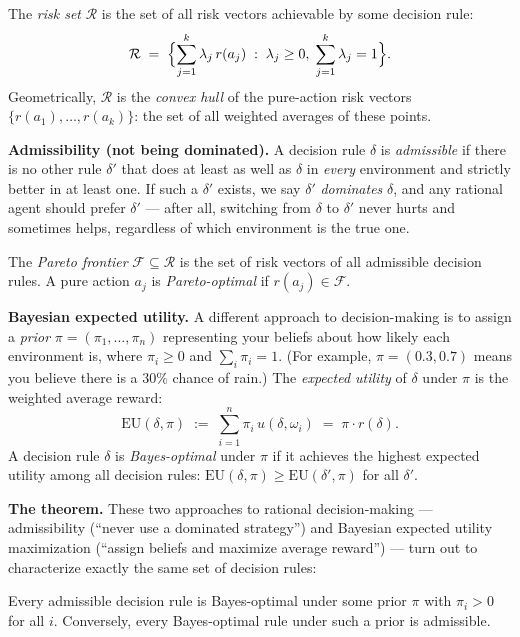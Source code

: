 \documentclass[11pt]{article}
\begin{document}
\begin{exercise}
\medskip
\noindent
The \emph{risk set} $\mathcal{R}$ is the set of all risk vectors achievable by some
decision rule:
\[
  \mathcal{R} \;=\; \Bigl\{\sum_{j=1}^k \lambda_j\, r(a_j) \;:\;
  \lambda_j \geq 0,\; \sum_{j=1}^k \lambda_j = 1\Bigr\}.
\]
Geometrically, $\mathcal{R}$ is the \emph{convex hull} of the pure-action risk
vectors $\{r(a_1), \ldots, r(a_k)\}$: the set of all weighted averages of these
points.

\medskip
\noindent
\textbf{Admissibility (not being dominated).} A decision rule $\delta$ is
\emph{admissible} if there is no other rule $\delta'$ that does at least as well as
$\delta$ in \emph{every} environment and strictly better in at least one. If such a
$\delta'$ exists, we say $\delta'$ \emph{dominates} $\delta$, and any rational agent
should prefer $\delta'$ --- after all, switching from $\delta$ to $\delta'$ never
hurts and sometimes helps, regardless of which environment is the true one.

\medskip
\noindent
The \emph{Pareto frontier} $\mathcal{F} \subseteq \mathcal{R}$ is the set of risk
vectors of all admissible decision rules. A pure action $a_j$ is
\emph{Pareto-optimal} if $r(a_j) \in \mathcal{F}$.

\medskip
\noindent
\textbf{Bayesian expected utility.} A different approach to decision-making is to
assign a \emph{prior} $\pi = (\pi_1, \ldots, \pi_n)$ representing your beliefs about
how likely each environment is, where $\pi_i \geq 0$ and $\sum_i \pi_i = 1$. (For
example, $\pi = (0.3, 0.7)$ means you believe there is a $30\%$ chance of rain.) The
\emph{expected utility} of $\delta$ under $\pi$ is the weighted average reward:
\[
  \mathrm{EU}(\delta, \pi) \;:=\;
  \sum_{i=1}^n \pi_i\, u(\delta, \omega_i) \;=\; \pi \cdot r(\delta).
\]
A decision rule $\delta$ is \emph{Bayes-optimal} under $\pi$ if it achieves the
highest expected utility among all decision rules:
$\mathrm{EU}(\delta, \pi) \geq \mathrm{EU}(\delta', \pi)$ for all $\delta'$.

\medskip
\noindent
\textbf{The theorem.} These two approaches to rational decision-making ---
admissibility (``never use a dominated strategy'') and Bayesian expected utility
maximization (``assign beliefs and maximize average reward'') --- turn out to
characterize exactly the same set of decision rules:

\begin{theorem}
Every admissible decision rule is
Bayes-optimal under some prior $\pi$ with $\pi_i > 0$ for all $i$. Conversely, every
Bayes-optimal rule under such a prior is admissible.
\end{theorem}


\end{exercise}
\end{document}
